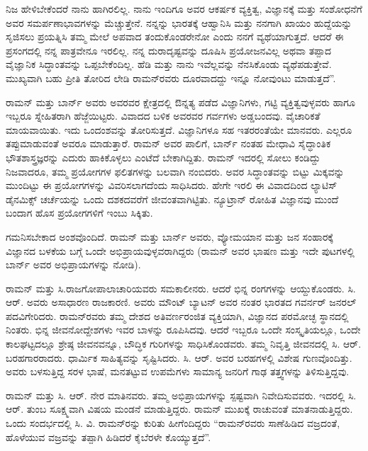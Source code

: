 ನಿಜ ಹೇಳಿಬೇಕೆಂದರೆ ನಾನು ಹಾಗಿರಲಿಲ್ಲ. ನಾನು ಇಂದಿಗೂ ಅವರ ಆಕರ್ಷಕ ವ್ಯಕ್ತಿತ್ವ, ವಿಜ್ಞಾನಕ್ಕೆ ಮತ್ತು ಸಂಶೋಧನೆಗೆ ಅವರ ಸಮರ್ಪಣಾಭಾವಗಳನ್ನು ಮೆಚ್ಚುತ್ತೇನೆ. ನನ್ನನ್ನು ಭಾರತಕ್ಕೆ ಆಹ್ವಾನಿಸಿ ಮತ್ತು ನನಗಾಗಿ ಖಾಯಂ ಹುದ್ದೆಯನ್ನು ಸೃಜಿಸಲು ಪ್ರಯತ್ನಿಸಿ ತಮ್ಮ ಮೇಲೆ ಅಪವಾದ ತಂದುಕೊಂಡರೇನೋ ಎಂದು ನನಗೆ ವ್ಯಥೆಯಾಗುತ್ತದೆ. ಆದರೆ ಈ ಪ್ರಸಂಗದಲ್ಲಿ ನನ್ನ ಪಾತ್ರವೇನೂ ಇರಲಿಲ್ಲ. ನನ್ನ ದುರಾದೃಷ್ಟವನ್ನು ದೂಷಿಸಿ ಪ್ರಯೋಜನವಿಲ್ಲ ಅಥವಾ ತಪ್ಪಾದ ವೈಜ್ಞಾನಿಕ ಸಿದ್ಧಾಂತವನ್ನು ಒಪ್ಪಬೇಕೆಂದಿಲ್ಲ. ಹೆಡಿ ಮತ್ತು ನಾನು ಇವೆಲ್ಲವನ್ನು ನೆನಸಿಕೊಂಡು ವ್ಯಥೆಪಡುತ್ತೇವೆ. ಮುಖ್ಯವಾಗಿ ಬಹು ಪ್ರೀತಿ ತೋರಿದ ಲೇಡಿ ರಾಮನ್‍ರವರು ದೂರವಾದದ್ದು ಇನ್ನೂ ನೋವುಂಟು ಮಾಡುತ್ತದೆ”.

ರಾಮನ್ ಮತ್ತು ಬಾರ್ನ್ ಅವರು ಅವರವರ ಕ್ಷೇತ್ರದಲ್ಲಿ ಔನ್ನತ್ಯ ಪಡೆದ ವಿಜ್ಞಾನಿಗಳು, ಗಟ್ಟಿ ವ್ಯಕ್ತಿತ್ವವುಳ್ಳವರು ಹಾಗೂ ಇಬ್ಬರೂ ಸ್ನೇಹಿತರಾಗಿ ಹೆಜ್ಜೆಯಿಟ್ಟರು. ವಿವಾದದ ಬಳಿಕ ಅವರವರ ಗರ್ವಗಳು ಅಡ್ಡಬಂದವು. ವೈಚಾರಿಕತೆ ಮಾಯವಾಯಿತು. ಇದು ಒಂದಂಶವನ್ನು ತೋರಿಸುತ್ತದೆ. ವಿಜ್ಞಾನಿಗಳೂ ಸಹ ಇತರರಂತೆಯೇ ಮಾನವರು. ಎಲ್ಲರೂ ತಪ್ಪುಮಾಡುವಂತೆ ಅವರೂ ಮಾಡುತ್ತಾರೆ. ರಾಮನ್ ಅವರ ಪಾಲಿಗೆ, ಬಾರ್ನ್ ನಂತಹ ಮೇಧಾವಿ ಸೈದ್ಧಾಂತಿಕ ಭೌತಶಾಸ್ತ್ರಜ್ಞರನ್ನು ಎದುರು ಹಾಕಿಕೊಳ್ಳಲು ಎಂಟೆದೆ ಬೇಕಾಗಿದ್ದಿತು. ರಾಮನ್ ಇದರಲ್ಲಿ ಸೋಲು ಕಂಡಿದ್ದು ನಿಜವಾದರೂ, ತಮ್ಮ ಪ್ರಯೋಗಗಳ ಫಲಿತಗಳನ್ನು ಬಲವಾಗಿ ನಂಬಿದರು. ಅವರ ಸಿದ್ಧಾಂತವನ್ನು ಬಿಟ್ಟು ಮಿಕ್ಕವನ್ನು ಮುಂದಿಟ್ಟು ಈ ಪ್ರಯೋಗಗಳನ್ನು ವಿವರಿಸಲಾಗದೆಂದು ಸಾಧಿಸಿದರು. ಹೇಗೇ ಇರಲಿ ಈ ವಿವಾದದಿಂದ ಲ್ಯಾಟಿಸ್ ಡೈನಮಿಕ್ಸ್ ಚರ್ಚೆಯನ್ನು ಒಂದು ದಶಕದವರೆಗೆ ಜೀವಂತವಾಗಿಟ್ಟಿತು. ನ್ಯೂಟ್ರಾನ್ ರೋಹಿತ ವಿಜ್ಞಾನವು ಮುಂದೆ ಬಂದಾಗ ಹೊಸ ಪ್ರಯೋಗಗಳಿಗೆ ಇಂಬು ಸಿಕ್ಕಿತು.

ಗಮನಿಸಬೇಕಾದ ಅಂಶವೊಂದಿದೆ. ರಾಮನ್ ಮತ್ತು ಬಾರ್ನ್ ಅವರು, ವ್ಯೋಮಯಾನ ಮತ್ತು ಜನ ಸಂಹಾರಕ್ಕೆ ವಿಜ್ಞಾನದ ಬಳಕೆಯ ಬಗ್ಗೆ ಒಂದೇ ಅಭಿಪ್ರಾಯವುಳ್ಳವರಾಗಿದ್ದರು (ರಾಮನ್ ಅವರ ಭಾಷಣ ಮತ್ತು ಇದೇ ಪುಟಗಳಲ್ಲಿ ಬಾರ್ನ್ ಅವರ ಅಭಿಪ್ರಾಯಗಳನ್ನು ನೋಡಿ).



ರಾಮನ್ ಮತ್ತು ಸಿ.ರಾಜಗೋಪಾಲಾಚಾರಿಯವರು ಸಮಕಾಲೀನರು. ಆದರೆ ಭಿನ್ನ ರಂಗಗಳನ್ನು ಆಯ್ದುಕೊಂಡರು. ಸಿ. ಆರ್. ಅವರು ಅಸಾಧಾರಣ ರಾಜಕಾರಣಿ. ಅವರು ಮೌಂಟ್ ಬ್ಯಾಟನ್ ಅವರ ನಂತರ ಭಾರತದ ಗವರ್ನರ್ ಜನರಲ್ ಪದವಿಗೇರಿದರು. ರಾಮನ್‍ರವರು ತಮ್ಮ ದೇಶದ ಅತಿವರ್ಣರಂಜಿತ ವ್ಯಕ್ತಿಯಾಗಿ, ವಿಜ್ಞಾನದ ಪರಮೋಚ್ಛ ಸ್ಥಾನದಲ್ಲಿ ನಿಂತರು. ಭಿನ್ನ ಜೀವನೋದ್ದೇಶಗಳು ಇವರ ಬಾಳನ್ನು ರೂಪಿಸಿದವು. ಆದರೆ ಇಬ್ಬರೂ ಒಂದೇ ಸಂಸ್ಕೃತಿಯಲ್ಲೂ, ಒಂದೇ ಕಾಲಘಟ್ಟದಲ್ಲೂ ಶ್ರೇಷ್ಠ ಜೀವನವನ್ನೂ, ಬೌದ್ಧಿಕ ಗುರಿಗಳನ್ನು ಸಾಧಿಸಿಕೊಂಡವರು. ತಮ್ಮ ನಿವೃತ್ತಿ ಜೀವನದಲ್ಲಿ ಸಿ. ಆರ್. ಬರಹಗಾರರಾದರು. ಧಾರ್ಮಿಕ ಸಾಹಿತ್ಯವನ್ನು ಸೃಷ್ಟಿಸಿದರು. ಸಿ. ಆರ್. ಅವರ ಬರಹಗಳಲ್ಲಿ ವಿಶೇಷ ಗುಣವೊಂದಿತ್ತು. ಅವರು ಬಳಸುತ್ತಿದ್ದ ಸರಳ ಭಾಷೆ, ಮನತಟ್ಟುವ ಉಪಮೆಗಳು ಸಾಮಾನ್ಯ ಜನರಿಗೆ ಗಾಢ ತತ್ತ್ವಗಳನ್ನು ತಿಳಿಸುತ್ತಿದ್ದವು.

ರಾಮನ್ ಮತ್ತು ಸಿ. ಆರ್. ನೇರ ಮಾತಿನವರು. ತಮ್ಮ ಅಭಿಪ್ರಾಯಗಳನ್ನು ಸ್ಪಷ್ಟವಾಗಿ ನಿವೇದಿಸುವವರು. ಇದರಲ್ಲಿ ಸಿ. ಆರ್. ತುಂಬ ಸೂಕ್ಷ್ಮವಾಗಿ ವಿಷಯ ಮಂಡನೆ ಮಾಡುತ್ತಿದ್ದರು. ರಾಮನ್ ಮುಖಕ್ಕೆ ರಾಚುವಂತೆ ಮಾತನಾಡುತ್ತಿದ್ದರು. ಒಂದು ಸಂದರ್ಭದಲ್ಲಿ ಸಿ. ವಿ. ರಾಮನ್‍ರನ್ನು ಕುರಿತು ಹೀಗೆಂದಿದ್ದರು \enginline{-} “ರಾಮನ್‍ರವರು ಸಾಣೆಹಿಡಿದ ವಜ್ರದಂತೆ, ಹೊಳೆಯುವ ವಜ್ರವನ್ನು ತಪ್ಪಾಗಿ ಹಿಡಿದರೆ ಕೈಬೆರಳೇ ಕೊಯ್ಯುತ್ತದೆ”.

